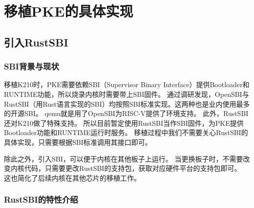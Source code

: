 \chapter{移植PKE的具体实现}

\section{引入RustSBI}

\subsection{SBI背景与现状}

移植K210时，PKE需要依赖SBI（Supervisor Binary Interface）提供Bootloader和RUNTIME功能，所以烧录内核时需要带上SBI固件。
通过调研发现，OpenSBI与RustSBI（用Rust语言实现的SBI）均按照SBI标准实现。这两种也是业内使用最多的开源SBI。
qemu就是用了OpenSBI为RISC-V提供了环境支持。
此外，RustSBI还对K210做了特殊支持。
所以目前暂定使用RustSBI当作SBI固件，为PKE提供Bootloader功能和RUNTIME运行时服务。
移植过程中我们不需要关心RustSBI的具体实现，只需要根据SBI标准调用其接口即可。

除此之外，引入SBI，可以便于内核在其他板子上运行。
当更换板子时，不需要改变内核代码，只需要更改RustSBI的支持包，获取对应硬件平台的支持包即可。
这也简化了后续内核在其他芯片的移植工作。

\subsection{RustSBI的特性介绍}

